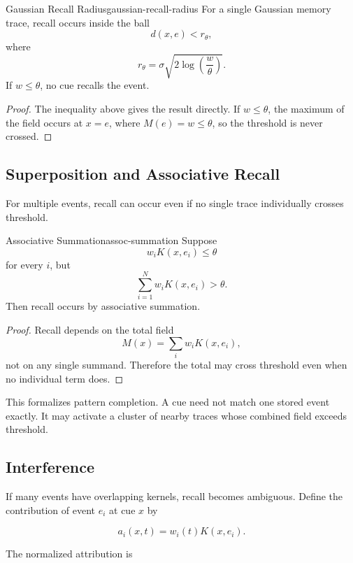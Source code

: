 \documentclass[12pt,twoside,openright]{book}
\begin{document}
\begin{proposition}{Gaussian Recall Radius}{gaussian-recall-radius}
  For a single Gaussian memory trace, recall occurs inside
  the ball
  \[
    d(x,e)
    <
    r_\theta,
  \]
  where
  \[
    r_\theta
=
    \sigma
    \sqrt{
      2\log\left(\frac{w}{\theta}\right)
    }.
  \]
  If \(w\le\theta\), no cue recalls the event.
\end{proposition}

\begin{proof}
  The inequality above gives the result directly. If
  \(w\le\theta\), the maximum of the field occurs at
  \(x=e\), where \(M(e)=w\le\theta\), so the threshold is
  never crossed.
\end{proof}

\subsection{Superposition and Associative Recall}

For multiple events, recall can occur even if no single
trace individually crosses threshold.

\begin{proposition}{Associative Summation}{assoc-summation}
  Suppose
  \[
    w_iK(x,e_i)\le\theta
  \]
  for every \(i\), but
  \[
    \sum_{i=1}^N w_iK(x,e_i)>\theta.
  \]
  Then recall occurs by associative summation.
\end{proposition}

\begin{proof}
  Recall depends on the total field
  \[
    M(x)=\sum_i w_iK(x,e_i),
  \]
  not on any single summand. Therefore the total may cross
  threshold even when no individual term does.
\end{proof}

This formalizes pattern completion. A cue need not match
one stored event exactly. It may activate a cluster of
nearby traces whose combined field exceeds threshold.

\subsection{Interference}

If many events have overlapping kernels, recall becomes
ambiguous. Define the contribution of event \(e_i\) at cue
\(x\) by

\[
a_i(x,t)
=
w_i(t)K(x,e_i).
\]

The normalized attribution is
\end{document}
